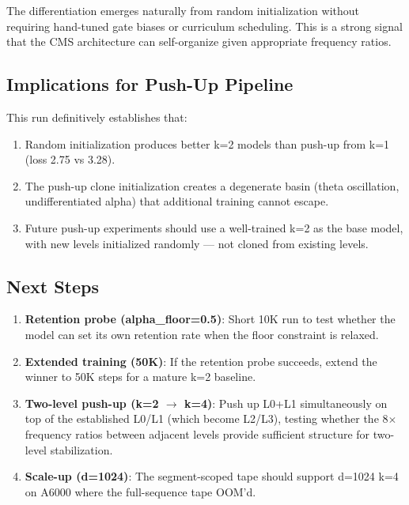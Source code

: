 \documentclass[11pt,a4paper]{article}
\begin{document}
The differentiation emerges naturally from random initialization without requiring hand-tuned gate biases or curriculum scheduling. This is a strong signal that the CMS architecture can self-organize given appropriate frequency ratios.

\subsection{Implications for Push-Up Pipeline}

This run definitively establishes that:
\begin{enumerate}
    \item Random initialization produces better k=2 models than push-up from k=1 (loss 2.75 vs 3.28).
    \item The push-up clone initialization creates a degenerate basin (theta oscillation, undifferentiated alpha) that additional training cannot escape.
    \item Future push-up experiments should use a well-trained k=2 as the base model, with new levels initialized randomly --- not cloned from existing levels.
\end{enumerate}

\subsection{Next Steps}

\begin{enumerate}
    \item \textbf{Retention probe (alpha\_floor=0.5)}: Short 10K run to test whether the model can set its own retention rate when the floor constraint is relaxed.
    \item \textbf{Extended training (50K)}: If the retention probe succeeds, extend the winner to 50K steps for a mature k=2 baseline.
    \item \textbf{Two-level push-up (k=2 $\to$ k=4)}: Push up L0+L1 simultaneously on top of the established L0/L1 (which become L2/L3), testing whether the 8$\times$ frequency ratios between adjacent levels provide sufficient structure for two-level stabilization.
    \item \textbf{Scale-up (d=1024)}: The segment-scoped tape should support d=1024 k=4 on A6000 where the full-sequence tape OOM'd.
\end{enumerate}
\end{document}
